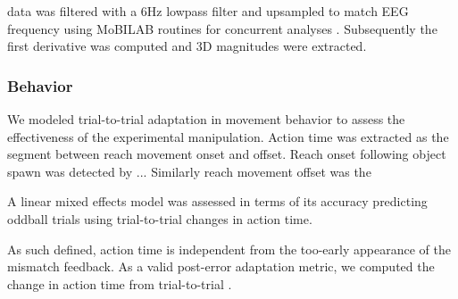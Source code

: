 data was filtered with a 6Hz lowpass filter and upsampled to match EEG frequency using MoBILAB routines for concurrent analyses \cite{Ojeda2014}. Subsequently the first derivative was computed and 3D magnitudes were extracted.

\subsubsection{Behavior}
We modeled trial-to-trial adaptation in movement behavior to assess the effectiveness of the experimental manipulation. Action time was extracted as the segment between reach movement onset and offset.
Reach onset following object spawn was detected by ...
Similarly reach movement offset was the 

A linear mixed effects model was assessed in terms of its accuracy predicting oddball trials using trial-to-trial changes in action time.

As such defined, action time is independent from the too-early appearance of the mismatch feedback. As a valid post-error adaptation metric, we computed the change in action time from trial-to-trial \cite{}. %



